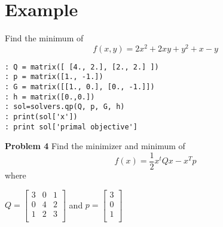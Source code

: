 \section*{Example}
Find the minimum of 
\begin{equation}
f(x,y) = 2x^2 +2xy + y^2 +x -y
\end{equation}
\begin{lstlisting}
: Q = matrix([ [4., 2.], [2., 2.] ])
: p = matrix([1., -1.])
: G = matrix([[1., 0.], [0., -1.]])
: h = matrix([0.,0.])
: sol=solvers.qp(Q, p, G, h)
: print(sol['x'])
: print sol['primal objective']
\end{lstlisting}



\textbf{Problem 4}
Find the minimizer and minimum of 
\begin{equation}
f(x) = \frac{1}{2}x^tQx - x^Tp
\end{equation}
where 

\begin{center}
$Q =
\begin{bmatrix}
3 & 0 & 1\\
0 & 4 & 2\\
1 & 2 & 3\\
\end{bmatrix}
$
and $p = 
\begin{bmatrix}
3\\
0\\
1\\
\end{bmatrix}
$
\end{center}

